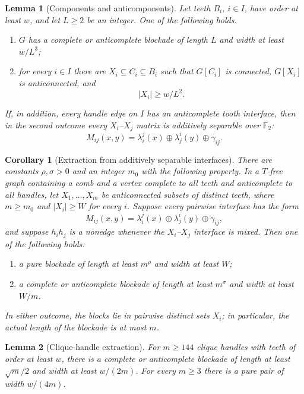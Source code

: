 \documentclass[10pt,a4paper]{amsart}
\newtheorem{lemma}{Lemma}
\newtheorem{corollary}{Corollary}
\begin{document}
\begin{lemma}[Components and anticomponents]
\label{lem:pivot-carriers}
Let teeth $B_i$, $i\in I$, have order at least $w$, and let $L\geq2$
be an integer.
One of the following holds.
\begin{enumerate}
 \item $G$ has a complete or anticomplete blockade of length $L$ and
       width at least $w/L^3$;
 \item for every $i\in I$ there are
       $X_i\subseteq C_i\subseteq B_i$ such that $G[C_i]$ is connected,
       $G[X_i]$ is anticonnected, and
       \[
                         |X_i|\geq w/L^2.
       \]
\end{enumerate}
If, in addition, every handle edge on $I$ has an anticomplete tooth
interface, then in the second outcome every $X_i$--$X_j$ matrix is additively separable over $\mathbb F_2$:
\begin{equation}
 M_{ij}(x,y)=\lambda_i^j(x)\oplus\lambda_j^i(y)
                                      \oplus\gamma_{ij}.
 \label{eq:pivot-carrier-affine}
\end{equation}
\end{lemma}

\begin{corollary}[Extraction from additively separable interfaces]
\label{cor:pivot-affine-extraction}
There are constants $\rho,\sigma>0$ and an integer $m_0$ with the
following property.  In a $T$-free graph containing a comb and a vertex
complete to all teeth and anticomplete to all handles, let
$X_1,\ldots,X_m$ be anticonnected subsets of distinct
teeth, where $m\geq m_0$ and $|X_i|\geq W$ for every $i$.  Suppose
every pairwise interface has the form
\[
 M_{ij}(x,y)=\lambda_i^j(x)\oplus\lambda_j^i(y)
                         \oplus\gamma_{ij},
\]
and suppose $h_ih_j$ is a nonedge whenever the $X_i$--$X_j$ interface
is mixed.  Then one of the following holds:
\begin{enumerate}
 \item a pure blockade of length at least $m^\rho$ and width at least
       $W$;
 \item a complete or anticomplete blockade of length at least
       $m^\sigma$ and width at least $W/m$.
\end{enumerate}
In either outcome, the blocks lie in pairwise distinct sets $X_i$; in
particular, the actual length of the blockade is at most $m$.
\end{corollary}

\begin{lemma}[Clique-handle extraction]
\label{lem:pivot-clique-extraction}
For $m\geq144$ clique handles with teeth of order at least $w$, there
is a complete or anticomplete blockade of length at least $\sqrt m/2$
and width at least $w/(2m)$.  For every $m\geq3$ there is a
pure pair of width $w/(4m)$.
\end{lemma}
\end{document}
